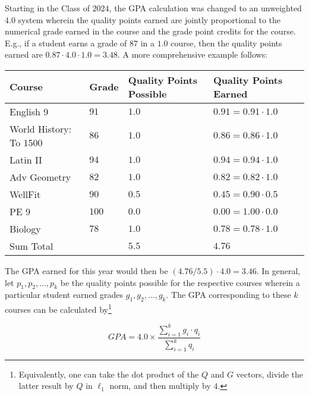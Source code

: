 Starting in the Class of $2024$, the GPA calculation was changed to an unweighted $4.0$ system wherein the quality points earned are jointly proportional to the numerical grade earned in the course and the grade point credits for the course. E.g., if a student earns a grade of $87$ in a $1.0$ course, then the quality points earned are $0.87\cdot 4.0\cdot 1.0 = 3.48$.  A more comprehensive example follows:
\begin{center}
\begin{tabular}{|l||l|l|l|}
  Course &Grade& Quality Points Possible& Quality Points Earned\\
  \hline
  \hline
 English 9      &   $91  $  & $1.0$ &  $0.91= 0.91\cdot 1.0$\\ 
 \hline                                
 World History:  To 1500  &   $ 86 $  &  $1.0$ &  $0.86 =0.86\cdot 1.0$\\ 
 \hline                                 
 Latin II       &   $94  $  &  $1.0$ &  $ 0.94=0.94\cdot 1.0$\\ 
 \hline                                
 Adv Geometry    &   $82  $  &  $1.0$ &  $0.82= 0.82\cdot 1.0$\\ 
 \hline                                
 WellFit        &   $90  $  &  $0.5$ &  $0.45= 0.90\cdot 0.5$\\ 
 \hline                                 
 PE 9         &   $ 100$  &  $0.0$  &  $0.00= 1.00\cdot 0.0$\\ 
 \hline                                 
 Biology     &   $ 78 $  &  $1.0$ &  $0.78= 0.78\cdot 1.0$\\ 
 \hline 
 \hline
 Sum Total &&$5.5$ & $4.76$ \\
 \hline
\end{tabular}

\end{center}

The GPA earned for this year would then be $(4.76/5.5)\cdot 4.0 = 3.46.$   In general, let $p_1,p_2,\ldots, p_k$ be the quality points possible for the respective courses wherein a particular student earned  grades $g_1,g_2,\ldots, g_k.$  The GPA corresponding to these $k$ courses can be calculated by\footnote{Equivalently, one can take the dot product of the $Q$ and $G$ vectors, divide  the latter result  by $Q$ in $\ell_1$ norm, and then multiply by $4.$}

$$\displaystyle GPA = 4.0\times \frac{\displaystyle\sum_{i=1}^k g_i\cdot q_i}{\displaystyle\sum_{i=1}^k q_i}$$








